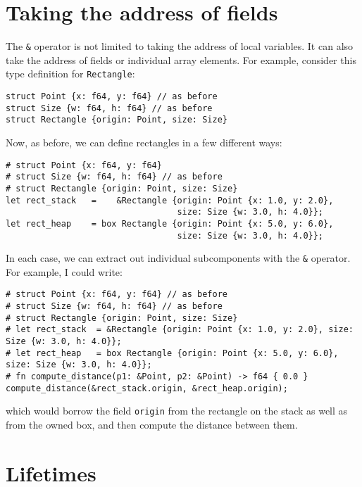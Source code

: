\documentclass[]{article}
\begin{document}
\section{Taking the address of
fields}\label{taking-the-address-of-fields}

The \texttt{\&} operator is not limited to taking the address of local
variables. It can also take the address of fields or individual array
elements. For example, consider this type definition for
\texttt{Rectangle}:

\begin{verbatim}
struct Point {x: f64, y: f64} // as before
struct Size {w: f64, h: f64} // as before
struct Rectangle {origin: Point, size: Size}
\end{verbatim}

Now, as before, we can define rectangles in a few different ways:

\begin{verbatim}
# struct Point {x: f64, y: f64}
# struct Size {w: f64, h: f64} // as before
# struct Rectangle {origin: Point, size: Size}
let rect_stack   =    &Rectangle {origin: Point {x: 1.0, y: 2.0},
                                  size: Size {w: 3.0, h: 4.0}};
let rect_heap    = box Rectangle {origin: Point {x: 5.0, y: 6.0},
                                  size: Size {w: 3.0, h: 4.0}};
\end{verbatim}

In each case, we can extract out individual subcomponents with the
\texttt{\&} operator. For example, I could write:

\begin{verbatim}
# struct Point {x: f64, y: f64} // as before
# struct Size {w: f64, h: f64} // as before
# struct Rectangle {origin: Point, size: Size}
# let rect_stack  = &Rectangle {origin: Point {x: 1.0, y: 2.0}, size: Size {w: 3.0, h: 4.0}};
# let rect_heap   = box Rectangle {origin: Point {x: 5.0, y: 6.0}, size: Size {w: 3.0, h: 4.0}};
# fn compute_distance(p1: &Point, p2: &Point) -> f64 { 0.0 }
compute_distance(&rect_stack.origin, &rect_heap.origin);
\end{verbatim}

which would borrow the field \texttt{origin} from the rectangle on the
stack as well as from the owned box, and then compute the distance
between them.

\section{Lifetimes}\label{lifetimes}
\end{document}
